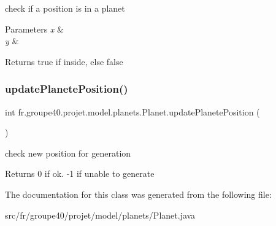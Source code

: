 check if a position is in a planet 


\begin{DoxyParams}{Parameters}
{\em x} & \\
\hline
{\em y} & \\
\hline
\end{DoxyParams}
\begin{DoxyReturn}{Returns}
true if inside, else false 
\end{DoxyReturn}
\mbox{\label{classfr_1_1groupe40_1_1projet_1_1model_1_1planets_1_1_planet_a55af7887127afab452dec09d5d149d90}} 
\subsubsection{\texorpdfstring{update\+Planete\+Position()}{updatePlanetePosition()}}
{\footnotesize\ttfamily int fr.\+groupe40.\+projet.\+model.\+planets.\+Planet.\+update\+Planete\+Position (\begin{DoxyParamCaption}{ }\end{DoxyParamCaption})}



check new position for generation 

\begin{DoxyReturn}{Returns}
0 if ok. -\/1 if unable to generate 
\end{DoxyReturn}


The documentation for this class was generated from the following file\+:\begin{DoxyCompactItemize}
\item 
src/fr/groupe40/projet/model/planets/Planet.\+java\end{DoxyCompactItemize}
